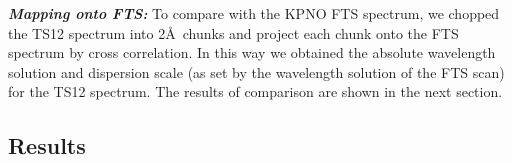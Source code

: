 \textbf{\textit{Mapping onto FTS:}} To compare with the KPNO FTS
spectrum, we chopped the TS12 spectrum into 2\AA\ chunks and project
each chunk onto the FTS spectrum by cross correlation. In this way we
obtained the absolute wavelength solution and dispersion scale (as set
by the wavelength solution of the FTS scan) for the TS12 spectrum. The
results of comparison are shown in the next section.



\subsection{Results}

